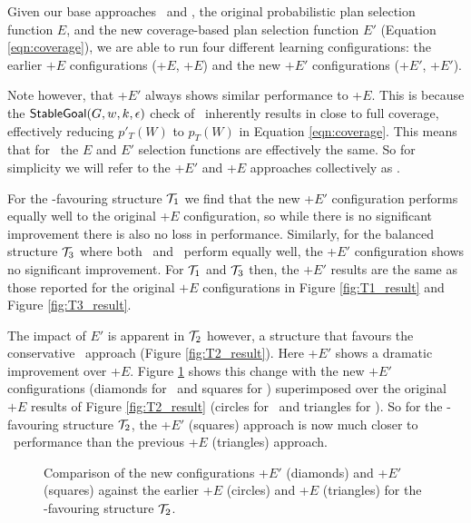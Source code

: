 Given our base approaches \CL\ and \BUL, the original probabilistic plan selection function $E$, and the new coverage-based plan selection function $E'$ (Equation \ref{eqn:coverage}), we are able to run four different learning configurations: the earlier $+E$ configurations (\CL+$E$, \BUL+$E$) and the new $+E'$ configurations (\CL+$E'$, \BUL+$E'$).

Note however, that \BUL+$E'$ always shows similar performance to \BUL+$E$. This is because the $\mathsf{StableGoal}(G,w,k,\epsilon)$ check of \BUL\ inherently results in close to full coverage, effectively reducing $p'_T(W)$ to $p_T(W)$ in Equation \ref{eqn:coverage}. This means that for \BUL\, the $E$ and $E'$ selection functions are effectively the same. So for simplicity we will refer to the \BUL+$E'$ and \BUL+$E$ approaches collectively as \BUL.

For the \CL-favouring structure ${\mathcal{T}}_1$ we find that the new \CL+$E'$ configuration performs equally well to the original \CL+$E$ configuration, so while there is no significant improvement there is also no loss in performance. Similarly, for the balanced structure ${\mathcal{T}}_3$ where both \CL\ and \BUL\ perform equally well, the \CL+$E'$ configuration shows no significant improvement. For ${\mathcal{T}}_1$ and ${\mathcal{T}}_3$ then, the $+E'$ results are the same as those reported for the original $+E$ configurations in Figure \ref{fig:T1_result} and Figure \ref{fig:T3_result}.

The impact of $E'$ is apparent in ${\mathcal{T}}_2$ however, a structure that favours the conservative \BUL\ approach (Figure \ref{fig:T2_result}). Here \CL+$E'$ shows a dramatic improvement over \CL+$E$. Figure \ref{fig:T2_result2} shows this change with the new $+E'$ configurations (diamonds for \BUL\ and squares for \CL) superimposed over the original $+E$ results of Figure \ref{fig:T2_result} (circles for \BUL\ and triangles for \CL). So for the \BUL-favouring structure ${\mathcal{T}}_2$, the \CL+$E'$ (squares) approach is now much closer to \BUL\ performance than the previous \CL+$E$ (triangles) approach.

\begin{figure}[ht]
\begin{center}

\end{center}
\caption{Comparison of the new configurations \BUL+$E'$ (diamonds) and \CL+$E'$ (squares) against the earlier \BUL+$E$ (circles) and \CL+$E$ (triangles) for the \BUL-favouring structure ${\mathcal{T}}_2$.}
\label{fig:T2_result2}
\end{figure}

